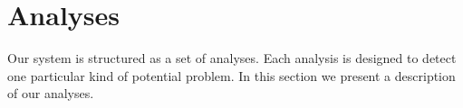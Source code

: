 \section{Analyses}
Our system is structured as a set of analyses. Each analysis is designed to detect one particular kind of potential problem. In this section we present a description of our analyses.






